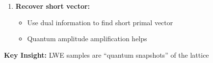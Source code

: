 \documentclass[aspectratio=169,10pt]{beamer}
\newcommand{\teaching}[1]{}
\theoremstyle{plain}
\begin{document}
\begin{frame}
\begin{enumerate}
    \item \textbf{Recover short vector:}
    \begin{itemize}
      \item Use dual information to find short primal vector
      \item Quantum amplitude amplification helps
    \end{itemize}
  \end{enumerate}
  
  \vspace{0.3cm}
  
  \begin{greenBox}
    \textbf{Key Insight:} LWE samples are ``quantum snapshots'' of the lattice
  \end{greenBox}
  
  \teaching{High-level theoretical understanding}
\end{frame}
\end{document}
